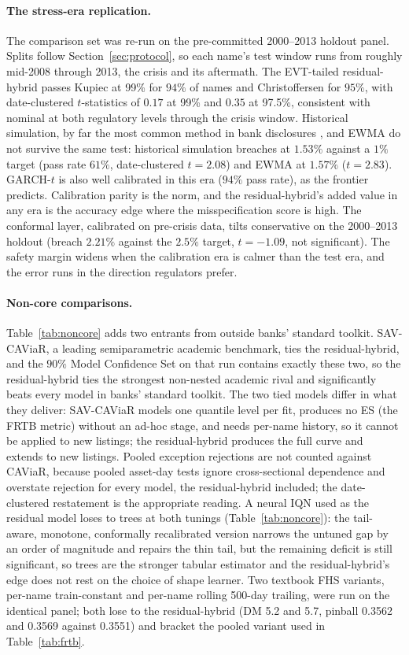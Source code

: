\documentclass[11pt]{article}
\theoremstyle{remark}
\begin{document}
\paragraph{The stress-era replication.} The comparison set was re-run on the pre-committed 2000--2013 holdout panel. Splits follow
Section~\ref{sec:protocol}, so each name's test window runs from
roughly mid-2008 through 2013, the crisis and its aftermath. The
EVT-tailed residual-hybrid passes Kupiec at 99\% for $94\%$ of names and
Christoffersen for $95\%$, with date-clustered $t$-statistics of
$0.17$ at 99\% and $0.35$ at 97.5\%, consistent with nominal at both regulatory levels through the crisis window. Historical simulation, by far the most common method in bank
disclosures \citep{perignonsmith2010}, and EWMA do not survive the same test: historical simulation
breaches at $1.53\%$ against a $1\%$ target (pass rate $61\%$,
date-clustered $t=2.08$) and EWMA at $1.57\%$ ($t=2.83$). GARCH-$t$ is also well calibrated in this era ($94\%$ pass rate), as the frontier predicts. Calibration parity is the norm, and the residual-hybrid's added value in any era is the accuracy edge where the misspecification score is high. The conformal layer, calibrated on pre-crisis data, tilts conservative on the 2000--2013 holdout (breach $2.21\%$ against the $2.5\%$ target, $t=-1.09$, not significant). The safety margin widens when the calibration era is calmer than the test era, and the error runs in the direction regulators prefer.

\paragraph{Non-core comparisons.} Table~\ref{tab:noncore} adds two entrants from outside banks' standard toolkit. SAV-CAViaR, a leading semiparametric academic benchmark, ties the residual-hybrid, and the $90\%$ Model Confidence Set on that run contains exactly these two, so the residual-hybrid ties the strongest non-nested academic rival and significantly beats every model in banks' standard toolkit. The two tied models differ in what they deliver: SAV-CAViaR models one quantile level per fit, produces no ES (the FRTB metric) without an ad-hoc stage, and needs per-name history, so it cannot be applied to new listings; the residual-hybrid produces the full curve and extends to new listings. Pooled exception rejections are not counted against CAViaR, because pooled asset-day tests ignore cross-sectional dependence and overstate rejection for every model, the residual-hybrid included; the date-clustered restatement is the appropriate reading. A neural IQN used as the residual model loses to trees at both tunings (Table~\ref{tab:noncore}): the tail-aware, monotone, conformally recalibrated version narrows the untuned gap by an order of magnitude and repairs the thin tail, but the remaining deficit is still significant, so trees are the stronger tabular estimator and the residual-hybrid's edge does not rest on the choice of shape learner. Two textbook FHS variants, per-name train-constant and per-name rolling 500-day trailing, were run on the identical panel; both lose to the residual-hybrid (DM 5.2 and 5.7, pinball 0.3562 and 0.3569 against 0.3551) and bracket the pooled variant used in Table~\ref{tab:frtb}.
\end{document}
